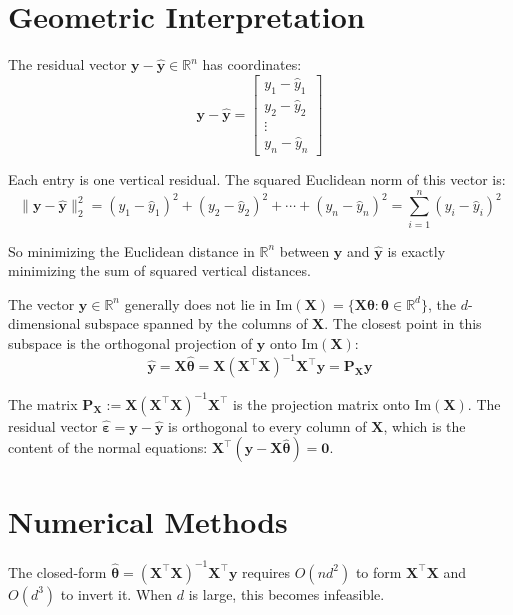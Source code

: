 \documentclass[main.tex]{subfiles}
\begin{document}
\needspace{0.33\textheight}
\section{Geometric Interpretation}

The residual vector $\mathbf{y} - \hat{\mathbf{y}} \in \mathbb{R}^n$ has coordinates:
$$\mathbf{y} - \hat{\mathbf{y}} = \begin{bmatrix} y_1 - \hat{y}_1 \\ y_2 - \hat{y}_2 \\ \vdots \\ y_n - \hat{y}_n \end{bmatrix}$$

Each entry is one vertical residual. The squared Euclidean norm of this vector is:
$$\|\mathbf{y} - \hat{\mathbf{y}}\|_2^2 = (y_1 - \hat{y}_1)^2 + (y_2 - \hat{y}_2)^2 + \cdots + (y_n - \hat{y}_n)^2 = \sum_{i=1}^{n}(y_i - \hat{y}_i)^2$$

So minimizing the Euclidean distance in $\mathbb{R}^n$ between $\mathbf{y}$ and $\hat{\mathbf{y}}$ is exactly minimizing the sum of squared vertical distances.

The vector $\mathbf{y} \in \mathbb{R}^n$ generally does not lie in $\text{Im}(\mathbf{X}) = \{\mathbf{X}\boldsymbol{\theta} : \boldsymbol{\theta} \in \mathbb{R}^d\}$, the $d$-dimensional subspace spanned by the columns of $\mathbf{X}$. The closest point in this subspace is the orthogonal projection of $\mathbf{y}$ onto $\text{Im}(\mathbf{X})$:
$$\hat{\mathbf{y}} = \mathbf{X}\hat{\boldsymbol{\theta}} = \mathbf{X}(\mathbf{X}^\top\mathbf{X})^{-1}\mathbf{X}^\top\mathbf{y} = \mathbf{P}_{\mathbf{X}}\mathbf{y}$$

The matrix $\mathbf{P}_{\mathbf{X}} := \mathbf{X}(\mathbf{X}^\top\mathbf{X})^{-1}\mathbf{X}^\top$ is the projection matrix onto $\text{Im}(\mathbf{X})$. The residual vector $\hat{\boldsymbol{\varepsilon}} = \mathbf{y} - \hat{\mathbf{y}}$ is orthogonal to every column of $\mathbf{X}$, which is the content of the normal equations: $\mathbf{X}^\top(\mathbf{y} - \mathbf{X}\hat{\boldsymbol{\theta}}) = \mathbf{0}$.

\needspace{0.33\textheight}
\section{Numerical Methods}

The closed-form $\hat{\boldsymbol{\theta}} = (\mathbf{X}^\top\mathbf{X})^{-1}\mathbf{X}^\top\mathbf{y}$ requires $O(nd^2)$ to form $\mathbf{X}^\top\mathbf{X}$ and $O(d^3)$ to invert it. When $d$ is large, this becomes infeasible.
\end{document}
